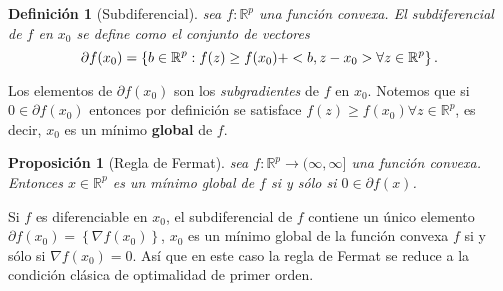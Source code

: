 \documentclass[12pt,draftcls, onecolumn, letterpaper,compsoc]{IEEEtran}
\newtheorem{definition}{\textbf{Definici\'{o}n}}
\newtheorem{proposition}{\textbf{Proposici\'{o}n}}
\begin{document}
\begin{definition}[Subdiferencial]
    sea $f:\mathbb{R}^{p}$ una funci\'{o}n convexa. El {\it subdiferencial} de $f$ en $x_0$ se define como el conjunto de vectores
    \begin{equation}
        \partial f(x_0) = \left\lbrace b \in \mathbb{R}^{p} : f(z) \geq f(x_0) + <b, z-x_0> \forall z\in \mathbb{R}^{p} \right\rbrace.\\
    \end{equation}
\end{definition}
Los elementos de $\partial f(x_0)$ son los {\it subgradientes} de $f$ en $x_0$. Notemos que si $0 \in \partial f(x_0)$ entonces por definici\'{o}n se satisface $f(z) \geq f(x_0) \forall z\in \mathbb{R}^{p}$, es decir, $x_0$ es un m\'{i}nimo \textbf{global} de $f$.\\

\begin{proposition}[Regla de Fermat]
sea $f:\mathbb{R}^{p} \rightarrow (\infty, \infty]$ una funci\'{o}n convexa. Entonces $x\in \mathbb{R}^{p}$ es un m\'{i}nimo global de $f$ si y s\'{o}lo si $0 \in \partial f(x)$.\\
\end{proposition}

Si $f$ es diferenciable en $x_0$, el subdiferencial de $f$ contiene un \'{u}nico elemento $\partial f(x_0) = \left\lbrace \nabla f(x_0)\right\rbrace$, $x_0$ es un m\'{i}nimo global de la funci\'{o}n convexa $f$ si y s\'{o}lo si $\nabla f(x_0)=0$. As\'{i} que en este caso la regla de Fermat se reduce a la condici\'{o}n cl\'{a}sica de optimalidad de primer orden.\\
\end{document}
